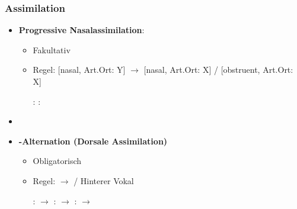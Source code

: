 \begin{frame}
\frametitle{Assimilation}

\begin{itemize}
	\item \textbf{Progressive Nasalassimilation}:

	\begin{itemize}
		\item Fakultativ
		\item Regel: [nasal, Art.Ort: Y] $\rightarrow$ [nasal, Art.Ort: X] /  [obstruent, Art.Ort: X] \underline{\quad} 

	\eal
		\ex {}:  \ras 
		\textipa{[ha:k\textsyllabic{n}]} \ras \textipa{[ha:k\textsyllabic{N}]}
		\ex {}:  \ras 
		\textipa{[SU\.p\textsyllabic{n}]} \ras \textipa{[SU\.p\textsyllabic{m}]}
	\zl
	
	\end{itemize}

	\item[]
	\item \textbf{\textipa{[\c{c}]/[x]}-Alternation (Dorsale Assimilation)}

	\begin{itemize}
		\item Obligatorisch
		\item Regel:  $\rightarrow$ \textipa{[x]} / Hinterer Vokal \underline{\quad}

	\eal
		\ex {}:  $\rightarrow$ \textipa{[mI\c{c}]}
		\ex {}:  $\rightarrow$ \textipa{[bu:x]}
		\ex {}:  $\rightarrow$ \textipa{[PEl\c{c}]}
	\zl
	
	\end{itemize}		

\end{itemize}

\end{frame}


